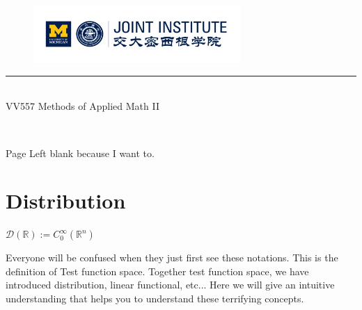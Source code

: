 \documentclass{article}
\numberwithin{equation}{section}
\newcommand{\<}{\langle}
\begin{document}
\setmainfont{Cormorant Upright}
\renewcommand\arraystretch{1.5}


\thispagestyle{empty}

\begin{center}
\begin{large}
\begin{figure}[!htbp]
\centering
\includegraphics[width=0.7\textwidth]{Logo2}
\end{figure}
\hrule
\vspace*{0.25cm}
 \\
\Large  VV557 Methods of Applied Math II\\
\end{large}
\hrulefill

\vspace*{2cm}
\begin{Large}
 \\
\end{Large}
\vspace*{2cm}
\begin{Large}

\end{Large}
\vspace*{0.5cm}
\begin{large}
\end{large}
\end{center}
\newpage

\begin{center}
\vspace*{6em}
Page Left blank because I want to.
\end{center}

\newpage
\setmainfont{Optima}
\setmonofont{Optima}
\setsansfont{Optima}
\setcounter{page}{1}
\normalsize
\section{Distribution}
\begin{tcolorbox}
\begin{center}
	\Huge $\mathcal{D}(\mathbb{R}):=C_0^{\infty}(\mathbb{R}^n)$
\end{center}
\end{tcolorbox}
Everyone will be confused when they just first see these notations. This is the definition of Test function space. Together test function space, we have introduced distribution, linear functional, etc... Here we will give an intuitive understanding that helps you to understand these terrifying concepts.
\end{document}
